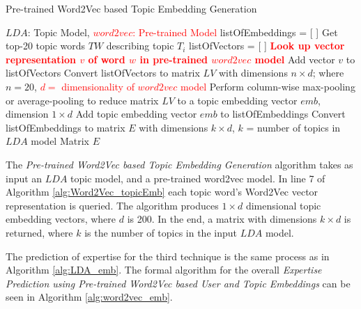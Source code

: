             \begin{algorithm}
            \caption{Pre-trained Word2Vec based Topic Embedding Generation}
            \label{alg:Word2Vec_topicEmb}
            \begin{algorithmic}[1]
                \REQUIRE $LDA$: Topic Model, \textcolor{red}{$word2vec$: Pre-trained Model}
                \STATE listOfEmbeddings = [ ]
                    \STATE Get top-20 topic words $TW$ describing topic $T_i$
                    \STATE listOfVectors = [ ]
                    \STATE
                        \STATE \textbf{\textcolor{red}{Look up vector representation $v$ of word $w$ in pre-trained $word2vec$ model}}
                        \STATE Add vector $v$ to listOfVectors
                    \ENDFOR
                    \STATE Convert listOfVectors to matrix $LV$ with dimensions $n \times d$; where $n=20$, \textcolor{red}{$d =$  dimensionality of $word2vec$ model}
                    \STATE Perform column-wise max-pooling or average-pooling to reduce matrix $LV$ to a topic embedding vector $emb$, dimension $1 \times d$
                    \STATE Add topic embedding vector $emb$ to listOfEmbeddings
                \ENDFOR
                \STATE Convert listOfEmbeddings to matrix $E$ with dimensions $k \times d$,  $k$ = number of topics in $LDA$ model
                \RETURN Matrix $E$
            \end{algorithmic}
            \end{algorithm}
            
            The \emph{Pre-trained Word2Vec based Topic Embedding Generation} algorithm takes as input an $LDA$ topic model, and a pre-trained word2vec model. In line 7 of Algorithm \ref{alg:Word2Vec_topicEmb} each topic word's Word2Vec vector representation is queried. The algorithm produces $1 \times d$ dimensional topic embedding vectors, where $d$ is 200. In the end, a matrix with dimensions $k \times d$ is returned, where $k$ is the number of topics in the input $LDA$ model.
            
            The prediction of expertise for the third technique is the same process as in Algorithm \ref{alg:LDA_emb}. The formal algorithm for the overall \emph{Expertise Prediction using Pre-trained Word2Vec based User and Topic Embeddings} can be seen in Algorithm \ref{alg:word2vec_emb}.
        
